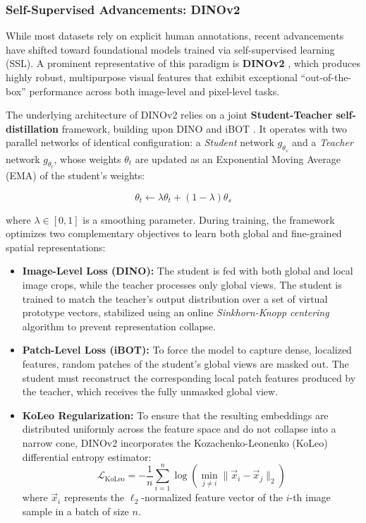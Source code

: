 \subsubsection{Self-Supervised Advancements: DINOv2}

While most datasets rely on explicit human annotations, recent advancements have shifted toward foundational models trained via self-supervised learning (SSL). A prominent representative of this paradigm is \textbf{DINOv2} \cite{oquab2024dinov}, which produces highly robust, multipurpose visual features that exhibit exceptional ``out-of-the-box'' performance across both image-level and pixel-level tasks.

The underlying architecture of DINOv2 relies on a joint \textbf{Student-Teacher self-distillation} framework, building upon DINO \cite{DINO} and iBOT \cite{ibot}. It operates with two parallel networks of identical configuration: a \textit{Student} network $g_{\theta_s}$ and a \textit{Teacher} network $g_{\theta_t}$, whose weights $\theta_t$ are updated as an Exponential Moving Average (EMA) of the student's weights:

\begin{equation}
	\theta_t \leftarrow \lambda \theta_t + (1 - \lambda) \theta_s
\end{equation}

where $\lambda \in [0, 1]$ is a smoothing parameter. During training, the framework optimizes two complementary objectives to learn both global and fine-grained spatial representations:

\begin{itemize}
	\item \textbf{Image-Level Loss (DINO):} The student is fed with both global and local image crops, while the teacher processes only global views. The student is trained to match the teacher's output distribution over a set of virtual prototype vectors, stabilized using an online \textit{Sinkhorn-Knopp centering} algorithm to prevent representation collapse.
	\item \textbf{Patch-Level Loss (iBOT):} To force the model to capture dense, localized features, random patches of the student's global views are masked out. The student must reconstruct the corresponding local patch features produced by the teacher, which receives the fully unmasked global view.
	\item \textbf{KoLeo Regularization:} To ensure that the resulting embeddings are distributed uniformly across the feature space and do not collapse into a narrow cone, DINOv2 incorporates the Kozachenko-Leonenko (KoLeo) differential entropy estimator:
	\begin{equation}
		\mathcal{L}_{\text{KoLeo}} = -\frac{1}{n}\sum_{i=1}^{n} \log \left( \min_{j \neq i} \| \vec{x}_i - \vec{x}_j \|_2 \right)
	\end{equation}
	where $\vec{x}_i$ represents the $\ell_2$-normalized feature vector of the $i$-th image sample in a batch of size $n$.
\end{itemize}	


